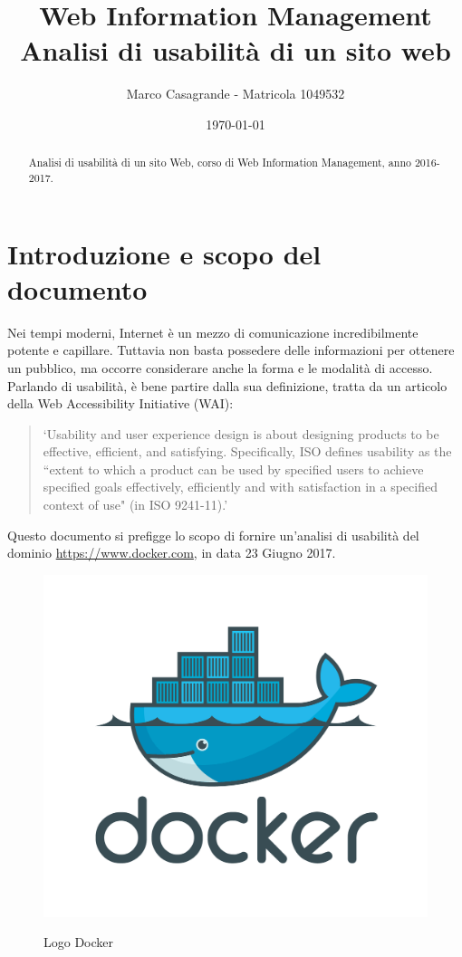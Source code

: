\documentclass[a4paper]{article}
\title{%
  Web Information Management \\
  \large Analisi di usabilità di un sito web}
\author{Marco Casagrande - Matricola 1049532}
\date{\today}
\begin{document}
\maketitle

\begin{abstract}
\noindent
Analisi di usabilità di un sito Web, corso di Web Information Management, anno 2016-2017.
\end{abstract}

\newpage
\tableofcontents

\newpage
\section{Introduzione e scopo del documento}

Nei tempi moderni, Internet è un mezzo di comunicazione incredibilmente potente e capillare. Tuttavia non basta possedere delle informazioni per ottenere un pubblico, ma occorre considerare anche la forma e le modalità di accesso.
\\
Parlando di usabilità, è bene partire dalla sua definizione, tratta da un articolo\cite{usab} della Web Accessibility Initiative (WAI):

\begin{quotation}
‘Usability and user experience design is about designing products to be effective, efficient, and satisfying. Specifically, ISO defines usability as the “extent to which a product can be used by specified users to achieve specified goals effectively, efficiently and with satisfaction in a specified context of use" (in ISO 9241-11).’
\end{quotation}

Questo documento si prefigge lo scopo di fornire un'analisi di usabilità del dominio \url{https://www.docker.com}, in data 23 Giugno 2017.

\begin{figure}[H]
	\centering
	\includegraphics[width=0.5\linewidth]{images/dockerlogo.jpg}
    \label{fig:logodocker}
	\caption{Logo Docker}
\end{figure}
\end{document}
